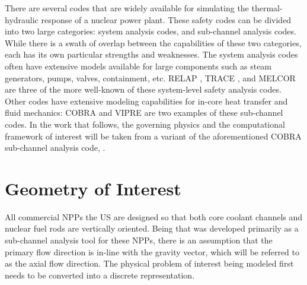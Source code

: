 There are several codes that are widely available for simulating the thermal-hydraulic response of a nuclear power plant.
These safety codes can be divided into two large categories: system analysis codes, and sub-channel analysis codes.
While there is a swath of overlap between the capabilities of these two categories, each has its own particular strengths and weaknesses.
The system analysis codes often have extensive models available for large components such as steam generators, pumps, valves, containment, etc.
RELAP \cite{RELAP}, TRACE \cite{TRACE}, and MELCOR \cite{Summers1994} are three of the more well-known of these system-level safety analysis codes.
Other codes have extensive modeling capabilities for in-core heat transfer and fluid mechanics: COBRA \cite{Thurgood1983c} and VIPRE are two examples of these sub-channel codes.
In the work that follows, the governing physics and the computational framework of interest will be taken from a variant of the aforementioned COBRA sub-channel analysis code, \cobra.
\section{Geometry of Interest}
\label{sect:topology}
All commercial NPPs the US are designed so that both core coolant channels and nuclear fuel rods are vertically oriented.
Being that \cobra was developed primarily as a sub-channel analysis tool for these NPPs, there is an assumption that the primary flow direction is in-line with the gravity vector, which will be referred to as the axial flow direction.
The physical problem of interest being modeled first needs to be converted into a discrete representation. 

